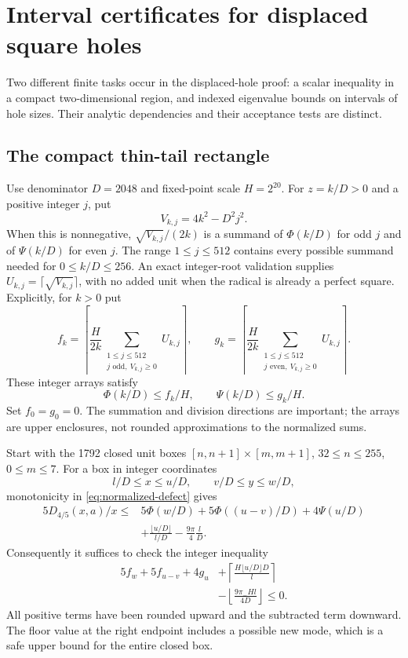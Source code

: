 \documentclass[11pt,reqno]{amsart}
\numberwithin{equation}{section}
\begin{document}
\section{Interval certificates for displaced square holes}\label{app:new-certificates}

Two different finite tasks occur in the displaced-hole
proof: a scalar inequality in a compact two-dimensional
region, and indexed eigenvalue bounds on intervals of
hole sizes. Their analytic dependencies and their
acceptance tests are distinct.

\subsection*{The compact thin-tail rectangle}

Use denominator $D=2048$ and fixed-point scale $H=2^{20}$.
For $z=k/D>0$ and a positive integer $j$, put
\[
 V_{k,j}=4k^2-D^2j^2.
\]
When this is nonnegative, $\sqrt{V_{k,j}}/(2k)$ is a
summand of $\Phi(k/D)$ for odd $j$ and of $\Psi(k/D)$
for even $j$. The range $1\le j\le512$ contains every
possible summand needed for $0\le k/D\le256$.
An exact integer-root validation supplies
$U_{k,j}=\lceil\sqrt{V_{k,j}}\rceil$, with no added unit
when the radical is already a perfect square. Explicitly,
for $k>0$ put
\[
 f_k=\left\lceil\frac{H}{2k}
       \sum_{\substack{1\le j\le512\\j\text{ odd},\ V_{k,j}\ge0}}
       U_{k,j}\right\rceil,
 \qquad
 g_k=\left\lceil\frac{H}{2k}
       \sum_{\substack{1\le j\le512\\j\text{ even},\ V_{k,j}\ge0}}
       U_{k,j}\right\rceil.
\]
These integer arrays satisfy
\[
 \Phi(k/D)\le f_k/H,\qquad \Psi(k/D)\le g_k/H.
\]
Set $f_0=g_0=0$. The summation and division directions
are important; the arrays are upper enclosures, not
rounded approximations to the normalized sums.

Start with the 1792 closed unit boxes
$[n,n+1]\times[m,m+1]$, $32\le n\le255$, $0\le m\le7$.
For a box in integer coordinates
\[
 l/D\le x\le u/D,\qquad v/D\le y\le w/D,
\]
monotonicity in \eqref{eq:normalized-defect} gives
\begin{align*}
 5D_{4/5}(x,a)/x
 \le{}&5\Phi(w/D)+5\Phi((u-v)/D)+4\Psi(u/D)\\
      &+\frac{\lfloor u/D\rfloor}{l/D}
        -\frac{9\pi}{4}\frac lD.
\end{align*}
Consequently it suffices to check the integer inequality
\begin{equation}\label{eq:thin-box-test}
\begin{split}
 5f_w+5f_{u-v}+4g_u
 &+\left\lceil\frac{H\lfloor u/D\rfloor D}{l}\right\rceil\\
 &-\left\lfloor\frac{9\pi_-H l}{4D}\right\rfloor\le0.
\end{split}
\end{equation}
All positive terms have been rounded upward and the
subtracted term downward. The floor value at the right
endpoint includes a possible new mode, which is a safe
upper bound for the entire closed box.
\end{document}
